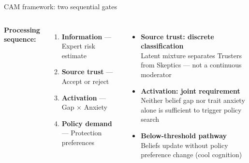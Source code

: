 \documentclass[aspectratio=169,11pt]{beamer}
\begin{document}
\begin{frame}{CAM framework: two sequential gates}

\begin{columns}[T]
\textbf{Processing sequence:}
\begin{enumerate}
    \item \textbf{Information} --- Expert risk estimate
    \item \textbf{Source trust} --- Accept or reject
    \item \textbf{Activation} --- Gap $\times$ Anxiety
    \item \textbf{Policy demand} --- Protection preferences
\end{enumerate}

\begin{itemize}
    \item \textbf{Source trust: discrete classification} \\
    {\small Latent mixture separates Trusters from Skeptics --- not a continuous moderator}
    \item \textbf{Activation: joint requirement} \\
    {\small Neither belief gap nor trait anxiety alone is sufficient to trigger policy search}
    \item \textbf{Below-threshold pathway} \\
    {\small Beliefs update without policy preference change (cool cognition)}
\end{itemize}
\end{columns}

\end{frame}
\end{document}
